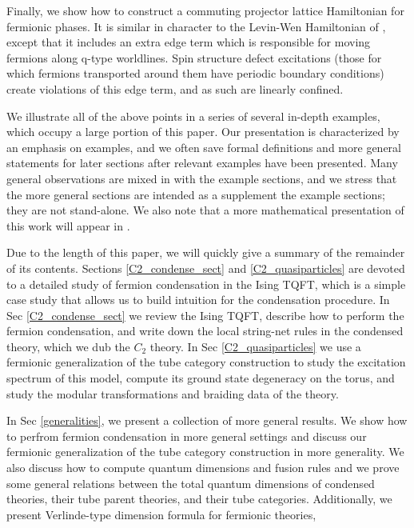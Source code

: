 \documentclass[12pt,a4paper]{article}
\begin{document}
Finally, we show how to construct a commuting projector lattice Hamiltonian 
for fermionic phases. It is similar in character to the Levin-Wen Hamiltonian of \cite{}, 
except that it includes an extra edge term which is responsible for moving fermions along
q-type worldlines. 
Spin structure defect excitations (those for which fermions transported around them have periodic 
boundary conditions) create violations of this edge term, and as such are linearly confined. 

We illustrate all of the above points in a series of several in-depth examples, which occupy a large portion 
of this paper.
Our presentation is characterized by an emphasis on examples, 
and we often save formal definitions and more general statements 
for later sections after relevant examples have been presented.  
Many general observations are mixed in with the example sections,
and we stress that the more general sections are intended as a supplement
the example sections; they are not stand-alone.
We also note that a more mathematical presentation of this work will appear in \cite{Kevin and scott's paper?}. 


Due to the length of this paper, we will quickly give a summary of the remainder of its contents.
Sections \ref{C2_condense_sect} and \ref{C2_quasiparticles} are devoted to a detailed study of 
fermion condensation in the Ising TQFT, which is a simple case study that allows us to build intuition for the condensation procedure.
In Sec \ref{C2_condense_sect} we review the Ising TQFT, describe how to perform the 
fermion condensation, and write down the local string-net rules in the condensed theory, 
which we dub the $C_2$ theory. 
In Sec \ref{C2_quasiparticles} we use a fermionic generalization of the tube category 
construction to study the excitation spectrum of this model, compute its ground state 
degeneracy on the torus, and study the modular transformations and braiding data of 
the theory. 

In Sec \ref{generalities}, we present a collection of more general results. 
We show how to perfrom fermion condensation in more general settings
and discuss our fermionic generalization 
of the tube category construction in more generality.
We also discuss how to compute quantum dimensions and fusion rules
and we prove some general
relations between the total quantum dimensions of condensed theories, their 
tube parent theories, and their tube categories.
Additionally, we present Verlinde-type 
dimension formula for fermionic theories,
\end{document}
